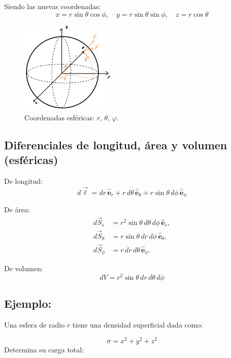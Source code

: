 \documentclass[a4paper,12pt]{article}
\begin{document}
\noindent Siendo las nuevas coordenadas:
\[
x = r\sin\theta\cos\phi, \quad y = r\sin\theta\sin\phi, \quad z = r\cos\theta
\]
\vspace{-2.0em}
\begin{figure}[htbp]
  \centering
  \includegraphics[width=0.40\textwidth]{esfericas.jpg}
  \caption{Coordenadas esféricas: $r$, $\theta$, $\varphi$.}
  \label{fig:esfericas}
\end{figure}

\subsection*{Diferenciales de longitud, área y volumen (esféricas)}

De longitud:
\[
d\vec{\ell} = dr\,\hat{\mathbf e}_r + r\,d\theta\,\hat{\mathbf e}_\theta + r\sin\theta\,d\phi\,\hat{\mathbf e}_\phi
\]

De área:
\[
\begin{aligned}
d\vec{S}_r      &= r^{2}\sin\theta\,d\theta\,d\phi\,\hat{\mathbf e}_r, \\
d\vec{S}_\theta &= r\sin\theta\,dr\,d\phi\,\hat{\mathbf e}_\theta, \\
d\vec{S}_\phi   &= r\,dr\,d\theta\,\hat{\mathbf e}_\phi.
\end{aligned}
\]

De volumen:
\[
dV = r^{2}\sin\theta\,dr\,d\theta\,d\phi
\]

\subsection*{Ejemplo:}
\noindent
Una esfera de radio $r$ tiene una densidad superficial dada como:

\[
\sigma = x^{2} + y^{2} + z^{2}
\]
Determina su carga total:
\end{document}
